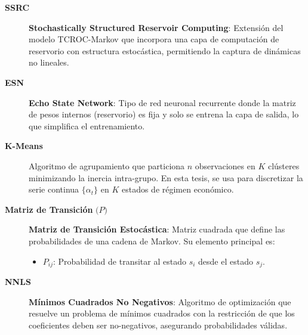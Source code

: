 \begin{description}
\item[\textbf{SSRC}]
\textbf{Stochastically Structured Reservoir Computing}:
Extensión del modelo TCROC-Markov que incorpora una capa de
computación de reservorio con estructura estocástica,
permitiendo la captura de dinámicas no lineales.
\end{description}

\begin{description}
\item[\textbf{ESN}]
\textbf{Echo State Network}:
Tipo de red neuronal recurrente donde la matriz de pesos
internos (reservorio) es fija y solo se entrena la capa
de salida, lo que simplifica el entrenamiento.
\end{description}

\begin{description}
\item[\textbf{K-Means}]
Algoritmo de agrupamiento que particiona $n$ observaciones en
$K$ clústeres minimizando la inercia intra-grupo.  En esta
tesis, se usa para discretizar la serie continua $\{\alpha_t\}$
en $K$ estados de régimen económico.
\end{description}

\begin{description}
\item[\textbf{Matriz de Transición} \(\bigl(P\bigr)\)]
\textbf{Matriz de Transición Estocástica}:
Matriz cuadrada que define las probabilidades de una cadena de Markov. Su elemento principal es:
\begin{itemize}
    \item \(P_{ij}\): Probabilidad de transitar al estado \(s_i\) desde el estado \(s_j\).
\end{itemize}
\end{description}

\begin{description}
\item[\textbf{NNLS}]
\textbf{Mínimos Cuadrados No Negativos}:
Algoritmo de optimización que resuelve un problema de mínimos cuadrados con la restricción de que los coeficientes deben ser no-negativos, asegurando probabilidades válidas.
\end{description}

